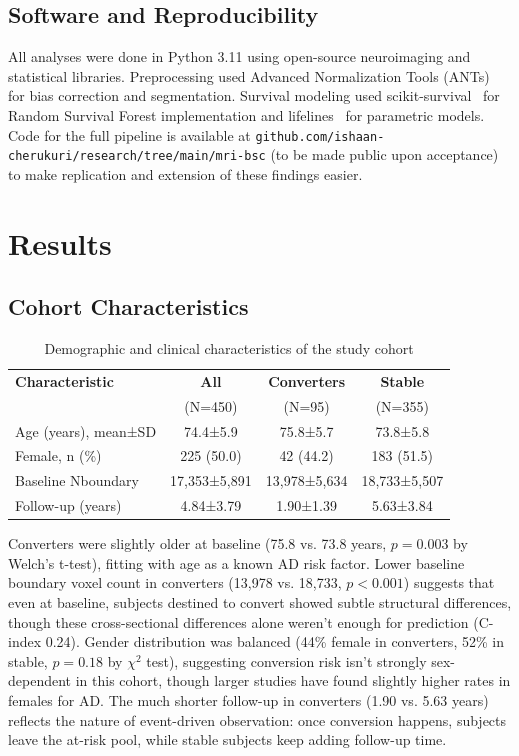 \documentclass[blue]{ludusofficial}  %
\begin{document}
\subsection{Software and Reproducibility}

All analyses were done in Python 3.11 using open-source neuroimaging and statistical libraries. Preprocessing used Advanced Normalization Tools (ANTs)~\cite{avants2011ants} for bias correction and segmentation. Survival modeling used scikit-survival~\cite{polsterl2020sksurv} for Random Survival Forest implementation and lifelines~\cite{davidson-pilon2019lifelines} for parametric models. Code for the full pipeline is available at \texttt{github.com/ishaan-cherukuri/research/tree/main/mri-bsc} (to be made public upon acceptance) to make replication and extension of these findings easier.

\section{Results}

\subsection{Cohort Characteristics}

\begin{table}[t!]
\centering
\caption{Demographic and clinical characteristics of the study cohort}
\label{tab:demographics}
\begin{tabular}{lccc}
\hline
\textbf{Characteristic} & \textbf{All} & \textbf{Converters} & \textbf{Stable} \\
 & (N=450) & (N=95) & (N=355) \\
\hline
Age (years), mean±SD & 74.4±5.9 & 75.8±5.7 & 73.8±5.8 \\
Female, n (\%) & 225 (50.0) & 42 (44.2) & 183 (51.5) \\
Baseline Nboundary & 17,353±5,891 & 13,978±5,634 & 18,733±5,507 \\
Follow-up (years) & 4.84±3.79 & 1.90±1.39 & 5.63±3.84 \\
\hline
\end{tabular}
\end{table}



Converters were slightly older at baseline (75.8 vs. 73.8 years, $p=0.003$ by Welch's t-test), fitting with age as a known AD risk factor. Lower baseline boundary voxel count in converters (13,978 vs. 18,733, $p<0.001$) suggests that even at baseline, subjects destined to convert showed subtle structural differences, though these cross-sectional differences alone weren't enough for prediction (C-index 0.24). Gender distribution was balanced (44\% female in converters, 52\% in stable, $p=0.18$ by $\chi^2$ test), suggesting conversion risk isn't strongly sex-dependent in this cohort, though larger studies have found slightly higher rates in females for AD. The much shorter follow-up in converters (1.90 vs. 5.63 years) reflects the nature of event-driven observation: once conversion happens, subjects leave the at-risk pool, while stable subjects keep adding follow-up time.
\end{document}
